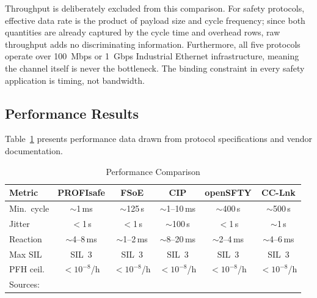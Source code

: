 \documentclass[conference]{IEEEtran}
\begin{document}
Throughput is deliberately excluded from this comparison. For safety
protocols, effective data rate is the product of payload size and cycle
frequency; since both quantities are already captured by the cycle time
and overhead rows, raw throughput adds no discriminating information.
Furthermore, all five protocols operate over 100~Mbps or 1~Gbps Industrial
Ethernet infrastructure, meaning the channel itself is never the bottleneck.
The binding constraint in every safety application is timing, not bandwidth.

\subsection{Performance Results}

Table~\ref{tab:perf} presents performance data drawn from protocol
specifications and vendor documentation.

\begin{table}[h]
\caption{Performance Comparison}
\label{tab:perf}
\centering
\scriptsize
\setlength{\tabcolsep}{2.8pt}
\renewcommand{\arraystretch}{1.15}
\begin{tabular}{l|ccccc}
\toprule
\textbf{Metric} & \textbf{PROFIsafe} & \textbf{FSoE} & \textbf{CIP} &
\textbf{openSFTY} & \textbf{CC-Lnk} \\
\midrule
Min.\ cycle & $\sim$1\,ms & $\sim$125\,\textmu{}s & $\sim$1--10\,ms &
  $\sim$400\,\textmu{}s & $\sim$500\,\textmu{}s \\
Jitter   & $<$1\,\textmu{}s & $<$1\,\textmu{}s & $\sim$100\,\textmu{}s &
  $<$1\,\textmu{}s & $\sim$1\,\textmu{}s \\
Reaction & $\sim$4--8\,ms & $\sim$1--2\,ms & $\sim$8--20\,ms &
  $\sim$2--4\,ms & $\sim$4--6\,ms \\
Max SIL  & SIL~3 & SIL~3 & SIL~3 & SIL~3 & SIL~3 \\
PFH ceil.& $<10^{-8}$/h & $<10^{-8}$/h & $<10^{-8}$/h &
  $<10^{-8}$/h & $<10^{-8}$/h \\
\bottomrule
\multicolumn{6}{l}{\scriptsize Sources: \cite{ETG5100,SiemensSafety,RockwellGuardLogix,BRopenSAFETY,CLPASafety}}
\end{tabular}
\end{table}
\end{document}
